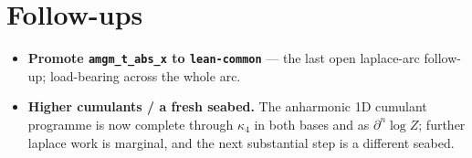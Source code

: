 \documentclass[11pt]{article}
\begin{document}
\section{Follow-ups}

\begin{itemize}[itemsep=3pt]
\item \textbf{Promote \texttt{amgm\_t\_abs\_x} to \texttt{lean-common}} --- the
  last open laplace-arc follow-up; load-bearing across the whole arc.
\item \textbf{Higher cumulants / a fresh seabed.} The anharmonic 1D cumulant
  programme is now complete through $\kappa_4$ in both bases and as
  $\partial^n\log Z$; further laplace work is marginal, and the next substantial
  step is a different seabed.
\end{itemize}
\end{document}
